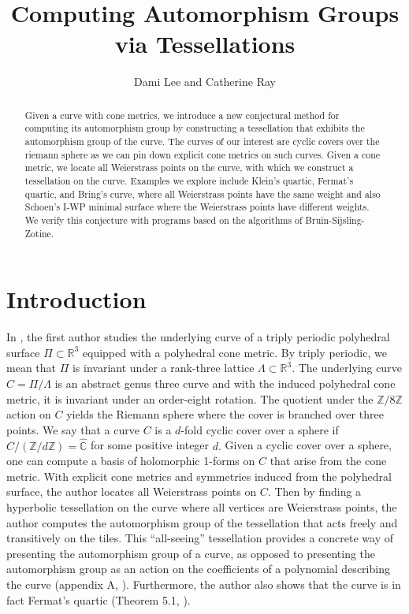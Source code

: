 \documentclass[12pt,reqno]{amsart}
\title{Computing Automorphism Groups via Tessellations}
\author{Dami Lee and Catherine Ray}
\newcommand{\C}{\mathbb{C}}
\newcommand{\Z}{\mathbb{Z}}
\newcommand{\R}{\mathbb{R}}
\theoremstyle{definition}
\theoremstyle{remark}
\begin{document}
	
\maketitle

\begin{abstract}
Given a curve with cone metrics, we introduce a new conjectural method for computing its automorphism group by constructing a tessellation that exhibits the automorphism group of the curve. The curves of our interest are cyclic covers over the riemann sphere as we can pin down explicit cone metrics on such curves. Given a cone metric, we locate all Weierstrass points on the curve, with which we construct a tessellation on the curve. Examples we explore include Klein's quartic, Fermat's quartic, and Bring's curve, where all Weierstrass points have the same weight and also Schoen's I-WP minimal surface where the Weierstrass points have different weights. We verify this conjecture with programs based on the algorithms of Bruin-Sijsling-Zotine.
\end{abstract}



\section{Introduction}


In \cite{dami}, the first author studies the underlying curve of a triply periodic polyhedral surface $\Pi \subset \R^3$ equipped with a polyhedral cone metric. By triply periodic, we mean that $\Pi$ is invariant under a rank-three lattice $\Lambda \subset \R^3.$ The underlying curve $C = \Pi / \Lambda$ is an abstract genus three curve and with the induced polyhedral cone metric, it is invariant under an order-eight rotation. The quotient under the $\Z/ 8 \Z$ action on $C$ yields the Riemann sphere where the cover is branched over three points. We say that a curve $C$ is a $d$-fold cyclic cover over a sphere if $C / (\Z / d \Z) = \widehat{\C}$ for some positive integer $d.$ Given a cyclic cover over a sphere, one can compute a basis of holomorphic 1-forms on $C$ that arise from the cone metric. With explicit cone metrics and symmetries induced from the polyhedral surface, the author locates all Weierstrass points on $C.$ Then by finding a hyperbolic tessellation on the curve where all vertices are Weierstrass points, the author computes the automorphism group of the tessellation that acts freely and transitively on the tiles. This ``all-seeing'' tessellation provides a concrete way of presenting the automorphism group of a curve, as opposed to presenting the automorphism group as an action on the coefficients of a polynomial describing the curve (appendix A, \cite{silverman}). Furthermore, the author also shows that the curve is in fact Fermat's quartic (Theorem 5.1, \cite{dami}).
\end{document}
